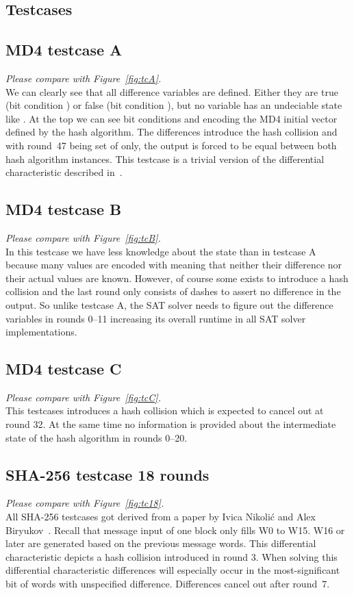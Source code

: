 \begin{appendices}
\chapter{Testcases}
\label{app:tc}
%
\newcommand\cmp[1]{\emph{Please compare with Figure~\ref{fig:#1}.} \\ }
%
\section{MD4 testcase A}
\label{sec:tcA}
\cmp{tcA}
We can clearly see that all difference variables are defined.
Either they are true (bit condition {\dnCx}) or false (bit condition {\dnCh}),
but no variable has an undeciable state like {\dnCq}. At the top we can see
bit conditions {\dnCz} and {\dnCo} encoding the MD4 initial vector defined
by the hash algorithm. The differences {\dnCx} introduce the hash collision
and with round~47 being set of {\dnCh} only, the output is forced to be
equal between both hash algorithm instances. This testcase
is a trivial version of the differential characteristic described
in~\cite{sasaki2007new}.

\section{MD4 testcase B}
\label{sec:tcB}
\cmp{tcB}
In this testcase we have less knowledge about the state than in testcase A
because many values are encoded with {\dnCq} meaning that neither their
difference nor their actual values are known.
However, of course some {\dnCx} exists to introduce a hash collision
and the last round only consists of dashes to assert no difference
in the output.
So unlike testcase A, the SAT solver needs to figure out the difference
variables in rounds 0--11 increasing its overall runtime in all SAT solver
implementations.

\section{MD4 testcase C}
\label{sec:tcC}
\cmp{tcC}
This testcases introduces a hash collision which is expected to cancel out
at round 32. At the same time no information is provided about the intermediate
state of the hash algorithm in rounds 0--20.

\section{SHA-256 testcase 18 rounds}
\label{sec:tc18}
\cmp{tc18}
All SHA-256 testcases got derived from a paper by Ivica Nikolić and Alex Biryukov~\cite{nikolic2008collisions}.
Recall that message input of one block only fills W0 to W15. W16 or later
are generated based on the previous message words. This differential characteristic
depicts a hash collision introduced in round 3. When solving this differential characteristic
differences will especially occur in the most-significant bit of words with unspecified
difference. Differences cancel out after round~7.


\end{appendices}
